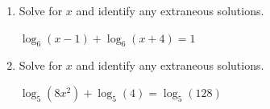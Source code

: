 \documentclass[11pt]{article}
\begin{document}
\begin{enumerate}
{{solutions: \(\boxed{ -\frac{6}{5} }\)

extraneous solutions: \(\boxed{ \text{none} }\)

}
}

\newpage

% 

\item %
\providecommand{\stxKnowl}{}\renewcommand{\stxKnowl}[1]{#1}
\providecommand{\stxOuttro}{}\renewcommand{\stxOuttro}[1]{#1}
\providecommand{\stxTitle}{}\renewcommand{\stxTitle}[1]{#1}
\renewcommand{\stxOuttro}[1]{}
\stxKnowl{
Solve for \(x\) and identify any extraneous solutions.

\(\log_{6}(x - 1) + \log_{6}(x + 4) = 1\)

\stxOuttro{
Solution

\[\begin{aligned} \log_{6}((x - 1)(x + 4)) &= 1 \\ 6 &= (x - 1)(x + 4) \\ 6 &= x^{2} + 3 \, x - 4 \\ 0 &= x^{2} + 3 \, x - 10 \\ 0 &= (x - 2)(x + 5) \end{aligned}\]

 \(x = 2\) is a valid solution, while \(x = -5\) causes a non-positive argument in the original logarithms. 

solutions: \(\boxed{ x = 2 }\)

extraneous solutions: \(\boxed{ x = -5 }\)

}
}

\newpage

% 

\item %
\providecommand{\stxKnowl}{}\renewcommand{\stxKnowl}[1]{#1}
\providecommand{\stxOuttro}{}\renewcommand{\stxOuttro}[1]{#1}
\providecommand{\stxTitle}{}\renewcommand{\stxTitle}[1]{#1}
\renewcommand{\stxOuttro}[1]{}
\stxKnowl{
Solve for \(x\) and identify any extraneous solutions.

\(\log_{5}(8x^2) + \log_{5}(4) = \log_{5}(128)\)

\stxOuttro{
Solution

\[\begin{aligned} \log_{5}(8x^2 \cdot 4) &= \log_{5}(128) \\ 32x^2 &= 128 \\ x^2 &= 4 \\ x &= \pm 2 \end{aligned}\]

}}
\end{enumerate}
\end{document}
